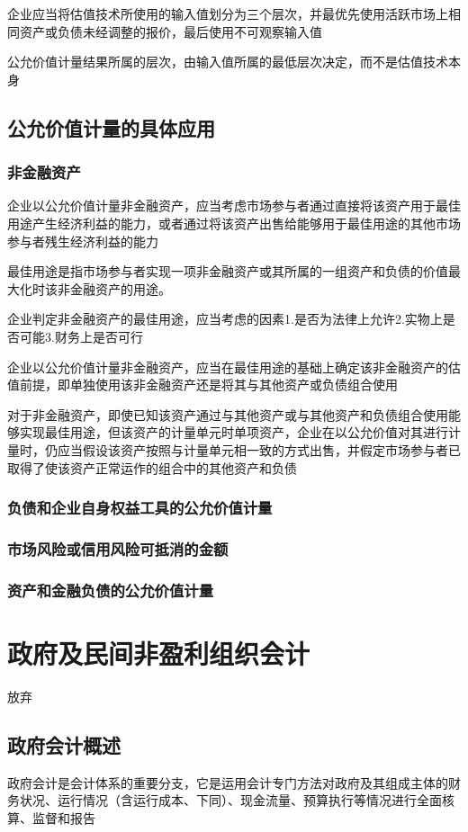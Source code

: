\documentclass[UTF8,12pt]{ctexart}
\numberwithin{equation}{section} %
\numberwithin{figure}{section}
\numberwithin{table}{section}
\begin{document}
	企业应当将估值技术所使用的输入值划分为三个层次，并最优先使用活跃市场上相同资产或负债未经调整的报价，最后使用不可观察输入值
	
	公允价值计量结果所属的层次，由输入值所属的最低层次决定，而不是估值技术本身
	
	\subsection{公允价值计量的具体应用}
	\subsubsection{非金融资产}
	企业以公允价值计量非金融资产，应当考虑市场参与者通过直接将该资产用于最佳用途产生经济利益的能力，或者通过将该资产出售给能够用于最佳用途的其他市场参与者残生经济利益的能力
	
	最佳用途是指市场参与者实现一项非金融资产或其所属的一组资产和负债的价值最大化时该非金融资产的用途。
	
	企业判定非金融资产的最佳用途，应当考虑的因素1.是否为法律上允许2.实物上是否可能3.财务上是否可行
	
	企业以公允价值计量非金融资产，应当在最佳用途的基础上确定该非金融资产的估值前提，即单独使用该非金融资产还是将其与其他资产或负债组合使用
	
	对于非金融资产，即使已知该资产通过与其他资产或与其他资产和负债组合使用能够实现最佳用途，但该资产的计量单元时单项资产，企业在以公允价值对其进行计量时，仍应当假设该资产按照与计量单元相一致的方式出售，并假定市场参与者已取得了使该资产正常运作的组合中的其他资产和负债
	
	\subsubsection{负债和企业自身权益工具的公允价值计量}
	\subsubsection{市场风险或信用风险可抵消的金额}
	\subsubsection{资产和金融负债的公允价值计量}
	
	\newpage
	
	\section{政府及民间非盈利组织会计}
	放弃
	\subsection{政府会计概述}
	政府会计是会计体系的重要分支，它是运用会计专门方法对政府及其组成主体的财务状况、运行情况（含运行成本、下同）、现金流量、预算执行等情况进行全面核算、监督和报告
\end{document}
